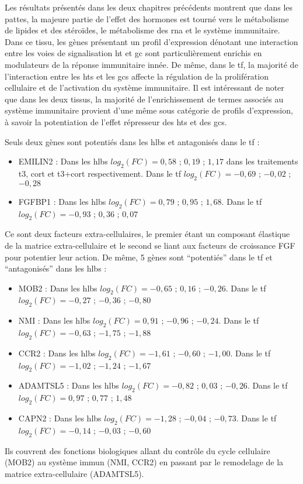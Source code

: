 \documentclass[../main.tex]{subfiles}
\begin{document}
	Les résultats présentés dans les deux chapitres précédents montrent que dans les pattes, la majeure partie de l'effet des hormones est tourné vers le métabolisme de lipides et des stéroïdes, le métabolisme des \gls{rna} et le système immunitaire.
	Dans ce tissu, les gènes présentant un profil d'expression dénotant une interaction entre les voies de signalisation \gls{ht} et \gls{gc} sont particulièrement enrichis en modulateurs de la réponse immunitaire innée.
	De même, dans le \gls{tf}, la majorité de l'interaction entre les \glspl{ht} et les \glspl{gc} affecte la régulation de la prolifération cellulaire et de l'activation du système immunitaire.
	Il est intéressant de noter que dans les deux tissus, la majorité de l'enrichissement de termes associés au système immunitaire provient d'une même sous catégorie de profils d'expression, à savoir la potentiation de l'effet répresseur des \glspl{ht} et des \glspl{gc}.
	\par
	Seuls deux gènes sont potentiés dans les \glspl{hlb} et antagonisés dans le \gls{tf} :
	\begin{itemize}
	\item EMILIN2 : Dans les \glspl{hlb} $log_2(FC)=0,58$ ; $0,19$ ; $1,17$ dans les traitements \gls{t3}, \gls{cort} et \gls{t3}+\gls{cort} respectivement. Dans le \gls{tf} $log_2(FC)=-0,69$ ; $-0,02$ ; $-0,28$
	\item FGFBP1 : Dans les \glspl{hlb} $log_2(FC)=0,79$ ; $0,95$ ; $1,68$. Dans le \gls{tf} $log_2(FC)=-0,93$ ; $0,36$ ; $0,07$
	\end{itemize}
	Ce sont deux facteurs extra-cellulaires, le premier étant un composant élastique de la matrice extra-cellulaire et le second se liant aux facteurs de croissance FGF pour potentier leur action.
	De même, 5 gènes sont ``potentiés'' dans le \gls{tf} et ``antagonisés'' dans les \glspl{hlb} :
	\begin{itemize}
	\item MOB2 : Dans les \glspl{hlb} $log_2(FC)=-0,65$ ; $0,16$ ; $-0,26$. Dans le \gls{tf} $log_2(FC)=-0,27$ ; $-0,36$ ; $-0,80$
	\item NMI : Dans les \glspl{hlb} $log_2(FC)=0,91$ ; $-0,96$ ; $-0,24$. Dans le \gls{tf} $log_2(FC)=-0,63$ ; $-1,75$ ; $-1,88$
	\item CCR2 : Dans les \glspl{hlb} $log_2(FC)=-1,61$ ; $-0,60$ ; $-1,00$. Dans le \gls{tf} $log_2(FC)=-1,02$ ; $-1,24$ ; $-1,67$
	\item ADAMTSL5 : Dans les \glspl{hlb} $log_2(FC)=-0,82$ ; $0,03$ ; $-0,26$. Dans le \gls{tf} $log_2(FC)=0,97$ ; $0,77$ ; $1,48$
	\item CAPN2 : Dans les \glspl{hlb} $log_2(FC)=-1,28$ ; $-0,04$ ; $-0,73$. Dans le \gls{tf} $log_2(FC)=-0,14$ ; $-0,03$ ; $-0,60$
	\end{itemize}
	Ils couvrent des fonctions biologiques allant du contrôle du cycle cellulaire (MOB2) au système immun (NMI, CCR2) en passant par le remodelage de la matrice extra-cellulaire (ADAMTSL5).
\end{document}

